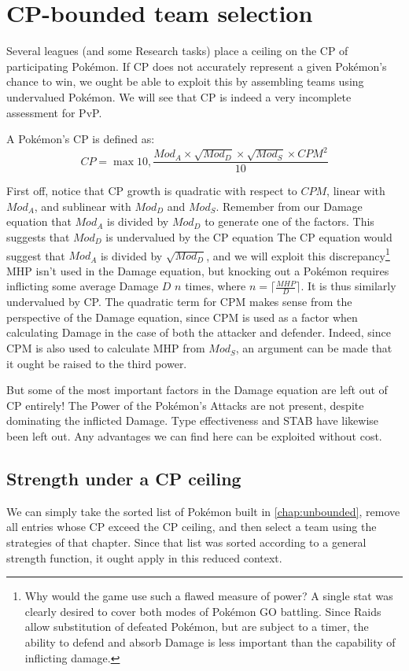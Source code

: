 \chapter{CP-bounded team selection}

Several leagues (and some Research tasks) place a ceiling on the CP of
 participating Pokémon.
If CP does not accurately represent a given Pokémon's chance to win, we ought
 be able to exploit this by assembling teams using undervalued Pokémon.
We will see that CP is indeed a very incomplete assessment for PvP.

A Pokémon's CP is defined as:
\[ CP = \max{10, \frac{Mod_A \times \sqrt{Mod_D} \times \sqrt{Mod_S} \times CPM^2}{10}} \]

First off, notice that CP growth is quadratic with respect to $CPM$,
 linear with $Mod_A$, and sublinear with $Mod_D$ and $Mod_S$.
Remember from our Damage equation that $Mod_A$ is divided by $Mod_D$
 to generate one of the factors.
This suggests that $Mod_D$ is undervalued by the CP equation
The CP equation would suggest that $Mod_A$ is divided by $\sqrt{Mod_D}$,
 and we will exploit this discrepancy\footnote{Why would the game use such
 a flawed measure of power? A single stat was clearly desired to cover both
 modes of Pokémon GO battling. Since Raids allow substitution of defeated
 Pokémon, but are subject to a timer, the ability to defend and absorb
 Damage is less important than the capability of inflicting damage.}
MHP isn't used in the Damage equation, but knocking out a Pokémon
 requires inflicting some average Damage $D$ $n$ times,
 where $n = \lceil\frac{MHP}{D}\rceil$.
It is thus similarly undervalued by CP\@.
The quadratic term for CPM makes sense from the perspective of the Damage
 equation, since CPM is used as a factor when calculating Damage in the
 case of both the attacker and defender.
Indeed, since CPM is also used to calculate MHP from $Mod_S$, an argument
 can be made that it ought be raised to the third power.

But some of the most important factors in the Damage equation are left
out of CP entirely! The Power of the Pokémon's Attacks are not present,
despite dominating the inflicted Damage. Type effectiveness and STAB
have likewise been left out. Any advantages we can find here can be
exploited without cost.

\section{Strength under a CP ceiling}
We can simply take the sorted list of Pokémon built in
\autoref{chap:unbounded}, remove all entries whose CP exceed the CP ceiling,
and then select a team using the strategies of that chapter. Since
that list was sorted according to a general strength function, it
ought apply in this reduced context.
